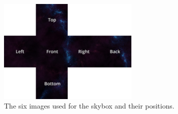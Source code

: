 
\begin{figure}[H]
	\centering
	\includegraphics[width=0.6\textwidth]{images/implementation/skybox}
	\caption[Skybox]{The six images used for the skybox and their positions.}
	\label{fig:skybox}
\end{figure}
